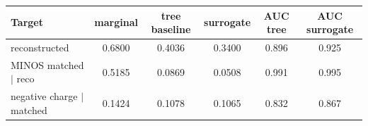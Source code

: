 \begin{tabular}{lccccc}
\toprule
Target & marginal & tree baseline & surrogate & AUC tree & AUC surrogate \\
\midrule
reconstructed & 0.6800 & 0.4036 & 0.3400 & 0.896 & 0.925 \\
MINOS matched $\mid$ reco & 0.5185 & 0.0869 & 0.0508 & 0.991 & 0.995 \\
negative charge $\mid$ matched & 0.1424 & 0.1078 & 0.1065 & 0.832 & 0.867 \\
\bottomrule
\end{tabular}
